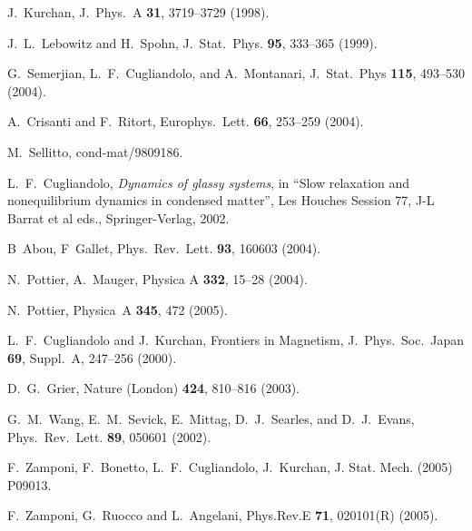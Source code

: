 \documentclass[pre,aps]{revtex4}
\begin{document}
\begin{thebibliography}{99}
 J.~Kurchan, 
J.~Phys.~A {\bf 31}, 3719--3729 (1998).

 J.~L.~Lebowitz and H.~Spohn,
J.~Stat.~Phys. {\bf 95}, 333--365 (1999).

G.~Semerjian, L.~F.~Cugliandolo, and A.~Montanari,
J.~Stat.~Phys {\bf 115}, 493--530 (2004).

A.~Crisanti and F.~Ritort,
Europhys.~Lett. {\bf 66}, 253--259 (2004).

M.~Sellitto, 
cond-mat/9809186.

L.~F.~Cugliandolo, 
{\it Dynamics of glassy systems},
in ``Slow relaxation and nonequilibrium dynamics in condensed matter'', 
Les Houches Session 77, J-L Barrat et al eds., Springer-Verlag, 2002.

B~Abou, F~Gallet,
Phys.~Rev.~Lett. {\bf 93}, 160603 (2004).

N.~Pottier, A.~Mauger,
Physica A {\bf 332}, 15--28 (2004).

N.~Pottier,
Physica~A {\bf 345}, 472 (2005).

 L.~F.~Cugliandolo and J.~Kurchan, 
Frontiers in Magnetism,
J.~Phys.~Soc.~Japan {\bf 69}, Suppl.~A, 247--256 (2000).

D.~G.~Grier, 
Nature (London) {\bf 424}, 810--816 (2003).

G.~M.~Wang, E.~M.~Sevick, E.~Mittag, D.~J.~Searles, and D.~J.~Evans,
Phys.~Rev.~Lett. {\bf 89}, 050601 (2002).

F.~Zamponi, F.~Bonetto, L.~F.~Cugliandolo, J.~Kurchan,
J. Stat. Mech. (2005) P09013.

F.~Zamponi, G.~Ruocco and L.~Angelani,
Phys.Rev.E {\bf 71}, 020101(R) (2005).



\end{thebibliography}
\end{document}
